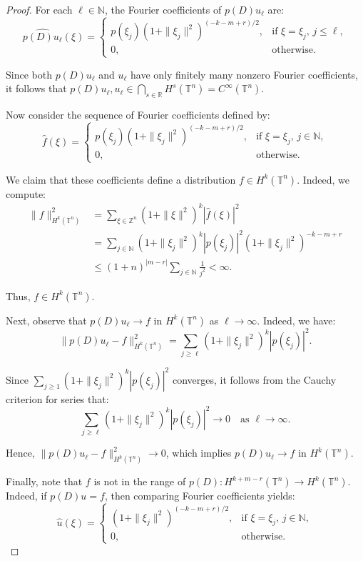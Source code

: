 \documentclass[11pt]{amsart}
\numberwithin{equation}{section}
\theoremstyle{definition}
\begin{document}
\begin{proof}
	For each $ \ell \in \mathbb{N} $, the Fourier coefficients of $ p(D)u_\ell $ are:
	\[
	\widehat{p(D)u_\ell}(\xi) =
	\begin{cases}
		p(\xi_j)(1 + \|\xi_j\|^2)^{(-k - m + r)/2}, & \text{if } \xi = \xi_j, \, j \leq \ell, \\
		0, & \text{otherwise.}
	\end{cases}
	\]
	
	Since both $ p(D)u_\ell $ and $ u_\ell $ have only finitely many nonzero Fourier coefficients, it follows that $ p(D)u_\ell, u_\ell \in \bigcap_{s \in \mathbb{R}} H^s(\mathbb{T}^n) = C^\infty(\mathbb{T}^n) $.
	
	Now consider the sequence of Fourier coefficients defined by:
	\[
	\widehat{f}(\xi) =
	\begin{cases}
		p(\xi_j)(1 + \|\xi_j\|^2)^{(-k - m + r)/2}, & \text{if } \xi = \xi_j, \, j \in \mathbb{N}, \\
		0, & \text{otherwise.}
	\end{cases}
	\]
	
	We claim that these coefficients define a distribution $ f \in H^k(\mathbb{T}^n) $. Indeed, we compute:
	\begin{align*}
		\|f\|_{H^k(\mathbb{T}^n)}^2 &= \sum_{\xi \in \mathbb{Z}^n} (1 + \|\xi\|^2)^k |\widehat{f}(\xi)|^2 \\
		&= \sum_{j \in \mathbb{N}} (1 + \|\xi_j\|^2)^k |p(\xi_j)|^2 (1 + \|\xi_j\|^2)^{-k - m + r} \\
		&\leq (1 + n)^{|m - r|} \sum_{j \in \mathbb{N}} \frac{1}{j^2} < \infty.
	\end{align*}
	
	Thus, $ f \in H^k(\mathbb{T}^n) $.
	
	\smallskip
	Next, observe that $ p(D)u_\ell \to f $ in $ H^k(\mathbb{T}^n) $ as $ \ell \to \infty $. Indeed, we have:
	\[
	\|p(D)u_\ell - f\|_{H^k(\mathbb{T}^n)}^2 = \sum_{j \geq \ell} (1 + \|\xi_j\|^2)^k |p(\xi_j)|^2.
	\]
	
	Since $ \sum_{j \geq 1} (1 + \|\xi_j\|^2)^k |p(\xi_j)|^2 $ converges, it follows from the Cauchy criterion for series that:
	\[
	\sum_{j \geq \ell} (1 + \|\xi_j\|^2)^k |p(\xi_j)|^2 \to 0 \quad \text{as } \ell \to \infty.
	\]
	
	Hence, $ \|p(D)u_\ell - f\|_{H^k(\mathbb{T}^n)}^2 \to 0 $, which implies $ p(D)u_\ell \to f $ in $ H^k(\mathbb{T}^n) $.
	
	Finally, note that $ f $ is not in the range of $ p(D): H^{k + m - r}(\mathbb{T}^n) \to H^k(\mathbb{T}^n) $. Indeed, if $ p(D)u = f $, then comparing Fourier coefficients yields:
	\[
	\widehat{u}(\xi) =
	\begin{cases}
		(1 + \|\xi_j\|^2)^{(-k - m + r)/2}, & \text{if } \xi = \xi_j, \, j \in \mathbb{N}, \\
		0, & \text{otherwise.}
	\end{cases}
	\]
	

\end{proof}
\end{document}
